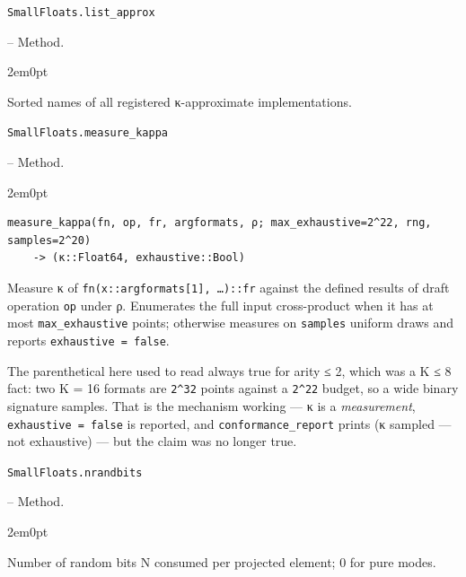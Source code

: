 \par\medskip\noindent\begin{minipage}{\linewidth}
\hypertarget{6068508418180240810}{\texttt{SmallFloats.list\_\allowbreak{}approx}}  -- {Method.}
\nopagebreak
\begin{adjustwidth}{2em}{0pt}

Sorted names of all registered κ-approximate implementations.



\end{adjustwidth}
\end{minipage}
\par\medskip

\par\medskip\noindent\begin{minipage}{\linewidth}
\hypertarget{1880978810980444415}{\texttt{SmallFloats.measure\_\allowbreak{}kappa}}  -- {Method.}
\nopagebreak
\begin{adjustwidth}{2em}{0pt}


\begin{verbatim}
measure_kappa(fn, op, fr, argformats, ρ; max_exhaustive=2^22, rng, samples=2^20)
    -> (κ::Float64, exhaustive::Bool)
\end{verbatim}

Measure κ of \texttt{fn(\allowbreak{}x::argformats[1], …)::fr} against the defined results of draft operation \texttt{op} under ρ. Enumerates the full input cross-product when it has at most \texttt{max\_\allowbreak{}exhaustive} points; otherwise measures on \texttt{samples} uniform draws and reports \texttt{exhaustive = false}.

The parenthetical here used to read {\textquotedbl}always true for arity ≤ 2{\textquotedbl}, which was a K ≤ 8 fact: two K = 16 formats are \texttt{2{\textasciicircum}32} points against a \texttt{2{\textasciicircum}22} budget, so a wide binary signature samples. That is the mechanism working — κ is a \emph{measurement}, \texttt{exhaustive = false} is reported, and \texttt{conformance\_\allowbreak{}report} prints {\textquotedbl}(κ sampled — not exhaustive){\textquotedbl} — but the claim was no longer true.



\end{adjustwidth}
\end{minipage}
\par\medskip

\par\medskip\noindent\begin{minipage}{\linewidth}
\hypertarget{2330527590949240408}{\texttt{SmallFloats.nrandbits}}  -- {Method.}
\nopagebreak
\begin{adjustwidth}{2em}{0pt}

Number of random bits N consumed per projected element; 0 for pure modes.



\end{adjustwidth}
\end{minipage}
\par\medskip

